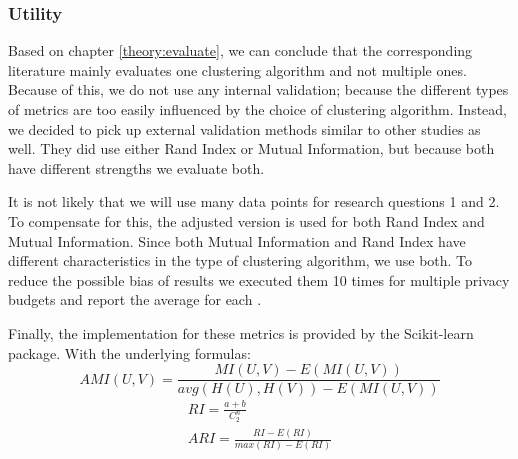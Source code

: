 \subsubsection{Utility}
Based on chapter \ref{theory:evaluate}, we can conclude that the corresponding literature mainly evaluates one clustering algorithm and not multiple ones.
Because of this, we do not use any internal validation; because the different types of metrics are too easily influenced by the choice of clustering algorithm.
Instead, we decided to pick up external validation methods similar to other studies as well.
They did use either Rand Index or Mutual Information, but because both have different strengths we evaluate both.

It is not likely that we will use many data points for research questions 1 and 2.
To compensate for this, the adjusted version is used for both Rand Index and Mutual Information.
Since both Mutual Information and Rand Index have different characteristics in the type of clustering algorithm, we use both.
To reduce the possible bias of results we executed them 10 times for multiple privacy budgets and report the average for each \citep{9679364}.

Finally, the implementation for these metrics is provided by the Scikit-learn package.
With the underlying formulas:
\begin{equation}
  AMI(U, V) = \frac{MI(U, V) - E(MI(U, V))}{avg(H(U), H(V)) - E(MI(U, V))}
\end{equation}
\begin{gather}
  RI = \frac{a + b}{C^{n}_{2}} \\
  ARI = \frac{RI - E(RI)}{max(RI) - E(RI)}
\end{gather}


